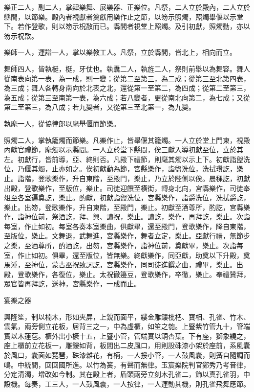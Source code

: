 \begin{pinyinscope}
 樂正二人，副二人，掌肄樂舞、展樂器、正樂位。凡祭，二人立於殿內，二人立於縣間，以節樂。殿內者視獻者奠獻用樂作止之節，以笏示照燭，照燭舉偃以示堂下。若作登歌，則以笏示柷敔而已。縣間者視堂上照燭。及引初獻，照燭動，亦以笏示柷敔。



 樂師一人，運譜一人，掌以樂教工人。凡祭，立於縣間，皆北上，相向而立。



 舞師四人，皆執梃，梃，牙仗也。執纛二人，執旌二人，祭則前舉以為舞容。舞人從南表向第一表，為一成，則一變；從第二至第三，為二成；從第三至北第四表，為三成；舞人各轉身南向於北表之北，還從第一至第二，為四成；從第二至第三，為五成；從第三至南第一表，為六成；若八變者，更從南北向第二，為七成；又從第二至第三，為八成；若九變者，又從第三至北第一，為九變。



 執麾一人，從協律郎以麾舉偃而節樂。



 照燭二人，掌執籠燭而節樂。凡樂作止，皆舉偃其籠燭。一人立於堂上門東，視殿內獻官禮節，麾燭以示縣間。一人立於堂下縣間，俟三獻入導初獻至位，立於其左。初獻行，皆前導，亞、終則否。凡殿下禮節，則麾其燭以示上下。初獻詣盥洗位，乃偃其燭，止亦如之。俟初獻動為節，宮縣樂作，詣盥洗位，洗拭瓚訖，樂止。詣階，登歌樂作，升自東階，至殿門，樂止，乃立於陛側以俟。晨稞訖，初獻出殿，登歌樂作，至版位，樂止。司徒迎饌至橫街，轉身北向，宮縣樂作，司徒奉俎至各室遍奠訖，樂止。酌獻，初獻詣盥洗位，宮縣樂作，詣爵洗位，洗拭爵訖，樂止。出笏，登歌樂作，升自東階，至殿門，樂止。初獻至酒尊所，酌訖，宮縣樂作，詣神位前，祭酒訖，拜、興、讀祝，樂止。讀訖，樂作，再拜訖，樂止。次詣每室，作止如初。每室各奏本室樂曲，俱獻畢，還至殿門，登歌樂作，降自東階，至版位，樂止。文舞退，武舞進，宮縣樂作，舞者立定，樂止。亞獻行禮，無節步之樂，至酒尊所，酌酒訖，出笏，宮縣樂作，詣神位前，奠獻畢，樂止。次詣每室，作止如初。俱畢，還至版位，皆無樂。終獻樂作，同亞獻，助奠以下升殿，奠馬湩，至神位，蒙古巫祝致詞訖，宮縣樂作，同司徒進饌之曲，禮畢，樂止。出殿，登歌樂作，各復位，樂止。太祝徹籩豆，登歌樂作，卒徹，樂止。奉禮贊拜，眾官皆再拜訖，送神，宮縣樂作，一成而止。



 宴樂之器



 興隆笙，制以楠木，形如夾屏，上銳而面平，縷金雕鏤枇杷、寶相、孔雀、竹木、雲氣，兩旁側立花板，居背三之一，中為虛櫃，如笙之匏。上豎紫竹管九十，管端實以木蓮苞。櫃外出小橛十五，上豎小管，管端實以銅杏葉。下有座，獅象繞之，座上櫃前立花板一，雕鏤如背，板間出二皮風口，用則設硃漆小架於座前，系風囊於風口，囊面如琵琶，硃漆雜花，有柄，一人挼小管，一人鼓風囊，則簧自隨調而鳴。中統間，回回國所進。以竹為簧，有聲而無律。玉宸樂院判官鄭秀乃考音律，分定清濁，增改如今制。其在殿上者，盾頭兩旁立刻木孔雀二，飾以真孔雀羽，中設機。每奏，工三人，一人鼓風囊，一人按律，一人運動其機，則孔雀飛舞應節。




\end{pinyinscope}
